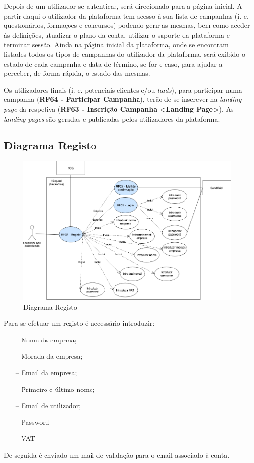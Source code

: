 Depois de um utilizador se autenticar, será direcionado para a página inicial. A partir daqui o utilizador da plataforma tem acesso à sua lista de campanhas (i. e. questionários, formações e concursos) podendo gerir as mesmas, bem como aceder às definições, atualizar o plano da conta, utilizar o suporte da plataforma e terminar sessão.
Ainda na página inicial da plataforma, onde se encontram listados todos os tipos de campanhas do utilizador da plataforma, será exibido o estado de cada campanha e data de término, se for o caso, para ajudar a perceber, de forma rápida, o estado das mesmas.

Os utilizadores finais (i. e. potenciais clientes e/ou \textit{leads}), para participar numa campanha (\textbf{RF64 - Participar Campanha}), terão de se inscrever na \textit{landing page} da respetiva (\textbf{RF63 - Inscrição Campanha <Landing Page>}). As \textit{landing pages} são geradas e publicadas pelos utilizadores da plataforma.

\newpage

\subsection{Diagrama Registo}
\label{d:registo}
\begin{figure}[ht!]
	\begin{center}
		\includegraphics[width=1\textwidth]{img/rf/registo}
		\caption{Diagrama Registo}
		\label{fig:rf-registo}
	\end{center}
\end{figure}

Para se efetuar um registo é necessário introduzir:
\begin{itemize}
	\setlength{\itemsep}{1pt}
	\item [--] Nome da empresa;
	\item [--] Morada da empresa;
	\item [--] Email da empresa;
	\item [--] Primeiro e último nome;
	\item [--] Email de utilizador;
	\item [--] Password
	\item [--] VAT
\end{itemize}
De seguida é enviado um mail de validação para o email associado à conta.

